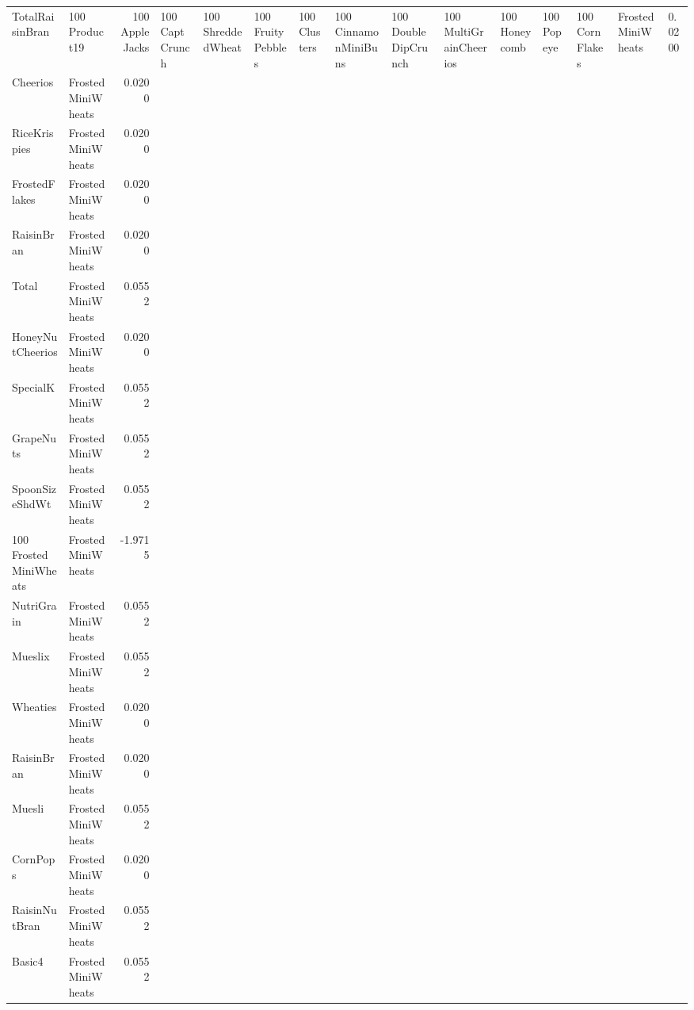 \begin{longtable}{llr}
TotalRaisinBran & 100%
Product19 & 100%
AppleJacks & 100%
CaptCrunch & 100%
ShreddedWheat & 100%
FruityPebbles & 100%
Clusters & 100%
CinnamonMiniBuns & 100%
DoubleDipCrunch & 100%
MultiGrainCheerios & 100%
Honeycomb & 100%
Popeye & 100%
CornFlakes & FrostedMiniWheats & 0.0200 \\
Cheerios & FrostedMiniWheats & 0.0200 \\
RiceKrispies & FrostedMiniWheats & 0.0200 \\
FrostedFlakes & FrostedMiniWheats & 0.0200 \\
RaisinBran & FrostedMiniWheats & 0.0200 \\
Total & FrostedMiniWheats & 0.0552 \\
HoneyNutCheerios & FrostedMiniWheats & 0.0200 \\
SpecialK & FrostedMiniWheats & 0.0552 \\
GrapeNuts & FrostedMiniWheats & 0.0552 \\
SpoonSizeShdWt & FrostedMiniWheats & 0.0552 \\
100%
FrostedMiniWheats & FrostedMiniWheats & -1.9715 \\
NutriGrain & FrostedMiniWheats & 0.0552 \\
Mueslix & FrostedMiniWheats & 0.0552 \\
Wheaties & FrostedMiniWheats & 0.0200 \\
RaisinBran & FrostedMiniWheats & 0.0200 \\
Muesli & FrostedMiniWheats & 0.0552 \\
CornPops & FrostedMiniWheats & 0.0200 \\
RaisinNutBran & FrostedMiniWheats & 0.0552 \\
Basic4 & FrostedMiniWheats & 0.0552 \\

\end{longtable}
